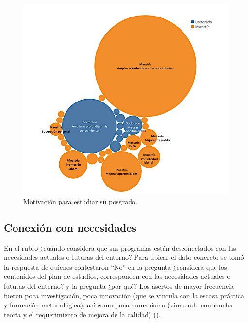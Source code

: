 \documentclass{textolivre}
\begin{document}
\begin{figure}[htbp]
 \hspace*{-1.3in}
 \includegraphics[width=1.22\textwidth]{Fig2.png}
 \caption{Motivación para estudiar su posgrado.}
 \label{fig2}
\end{figure}

\subsection{Conexión con necesidades}\label{sec-idioma}
En el rubro ¿cuándo considera que sus programas están desconectados con las necesidades actuales o futuras del entorno? Para ubicar el dato concreto se tomó la respuesta de quienes contestaron “No” en la pregunta ¿considera que los contenidos del plan de estudios, corresponden con las necesidades actuales o futuras del entorno? y la pregunta  ¿por qué? Los asertos de mayor frecuencia fueron poca investigación, poca innovación (que se vincula con la escasa práctica y formación metodológica), así como poco humanismo (vinculado con mucha teoría y el requerimiento de mejora de la calidad) ().
\end{document}
